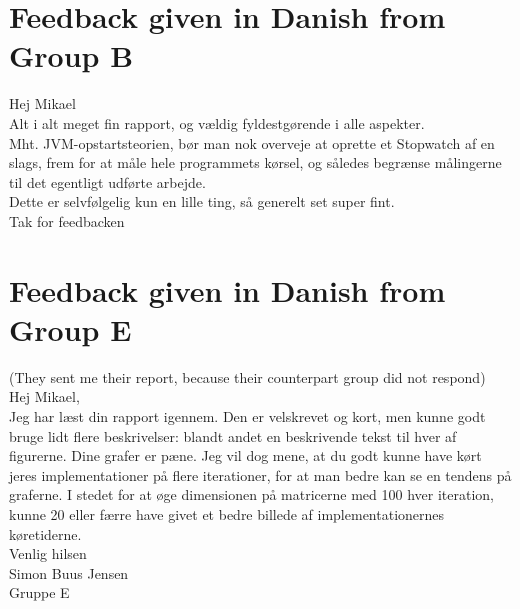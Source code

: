 \documentclass{article}
\begin{document}
	\section{Feedback given in Danish from Group B}

Hej Mikael\\

\noindent Alt i alt meget fin rapport, og vældig fyldestgørende i alle aspekter.\\
Mht. JVM-opstartsteorien, bør man nok overveje at oprette et Stopwatch af en slags, frem for at måle hele programmets kørsel, og således begrænse målingerne til det egentligt udførte arbejde.\\
Dette er selvfølgelig kun en lille ting, så generelt set super fint.\\

\noindent Tak for feedbacken

\section{Feedback given in Danish from Group E}
(They sent me their report, because their counterpart group did not respond)\\

\noindent Hej Mikael,\\

\noindent Jeg har læst din rapport igennem. Den er velskrevet og kort, men kunne godt bruge lidt flere beskrivelser: blandt andet en beskrivende tekst til hver af figurerne. Dine grafer er pæne. Jeg vil dog mene, at du godt kunne have kørt jeres implementationer på flere iterationer, for at man bedre kan se en tendens på graferne. I stedet for at øge dimensionen på matricerne med 100 hver iteration, kunne 20 eller færre have givet et bedre billede af implementationernes køretiderne.\\

\noindent Venlig hilsen\\
Simon Buus Jensen\\
Gruppe E
\end{document}

